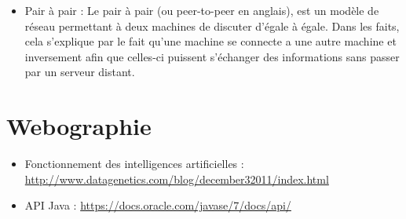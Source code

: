 \begin{itemize}
\item Pair à  pair :
    Le pair à  pair (ou peer-to-peer en anglais), est un modèle de réseau permettant à  deux machines de discuter d'égale à  égale.
    Dans les faits, cela s'explique par le fait qu'une machine se connecte a une autre machine et inversement afin que celles-ci puissent s'échanger des informations
    sans passer par un serveur distant.
\end{itemize}


\newpage
\section{Webographie}
\begin{itemize}
	\item Fonctionnement des intelligences artificielles : \url{http://www.datagenetics.com/blog/december32011/index.html}
\newline	
	\item API Java : \url{https://docs.oracle.com/javase/7/docs/api/}
\end{itemize}